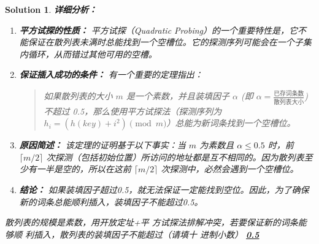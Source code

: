 \documentclass[UTF8]{report}
\newtheorem{solution}{Solution}
\theoremstyle{MyLineTheoremStyle} %
\theoremstyle{MyBlockTheoremStyle} %
\theoremstyle{MySubsubsectionStyle} %
\begin{document}
\begin{solution}
\textbf{详细分析：}

\begin{enumerate}
    \item \textbf{平方试探的性质：}
    平方试探（Quadratic Probing）的一个重要特性是，它不能保证在散列表未满时总能找到一个空槽位。它的探测序列可能会在一个子集内循环，从而错过其他可用的空槽。

    \item \textbf{保证插入成功的条件：}
    有一个重要的定理指出：
    \begin{quote}
        如果散列表的大小 $m$ 是一个素数，并且装填因子 $\alpha$ (即 $\alpha = \frac{\text{已存词条数}}{\text{散列表大小}}$) 不超过 0.5，那么使用平方试探法（探测序列为 $h_i = (h(key) + i^2) \pmod m$）总能为新词条找到一个空槽位。
    \end{quote}

    \item \textbf{原因简述：}
    该定理的证明基于以下事实：当 $m$ 为素数且 $\alpha \le 0.5$ 时，前 $\lceil m/2 \rceil$ 次探测（包括初始位置）所访问的地址都是互不相同的。因为散列表至少有一半是空的，所以在这前 $\lceil m/2 \rceil$ 次探测中，必然会遇到一个空槽位。

    \item \textbf{结论：}
    如果装填因子超过0.5，就无法保证一定能找到空位。因此，为了确保新的词条总能顺利插入，装填因子不能超过0.5。
\end{enumerate}

\hrulefill

散列表的规模是素数，用开放定址+平
方试探法排解冲突，若要保证新的词条能够顺
利插入，散列表的装填因子不能超过（请填十
进制小数）
\underline{\hspace{2cm}\textbf{0.5}\hspace{2cm}}
\end{solution}
\end{document}
